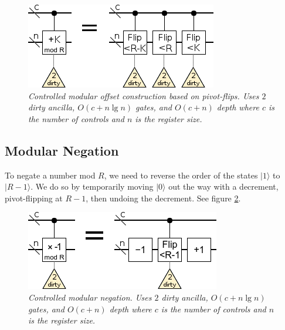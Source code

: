 \documentclass[twocolumn]{article}
\begin{document}
\begin{figure}
  \centering
  \includegraphics[width=\linewidth]{assets/controlled-modular-offset.png}
  \caption{\em
    Controlled modular offset construction based on pivot-flips.
    Uses $2$ dirty ancilla, $O(c + n \lg n)$ gates, and $O(c + n)$ depth where $c$ is the number of controls and $n$ is the register size.
  }
  \label{fig:controlled-modular-offset}
\end{figure}


\subsection{Modular Negation}

To negate a number mod $R$, we need to reverse the order of the states $|1\rangle$ to $|R-1\rangle$.
We do so by temporarily moving $|0\rangle$ out the way with a decrement, pivot-flipping at $R-1$, then undoing the decrement.
See figure \ref{fig:negate-mod}.

\begin{figure}
  \centering
  \includegraphics[width=\linewidth]{assets/negate-mod.png}
  \caption{\em
    Controlled modular negation.
    Uses $2$ dirty ancilla, $O(c + n \lg n)$ gates, and $O(c + n)$ depth where $c$ is the number of controls and $n$ is the register size.
  }
  \label{fig:negate-mod}
\end{figure}
\end{document}
